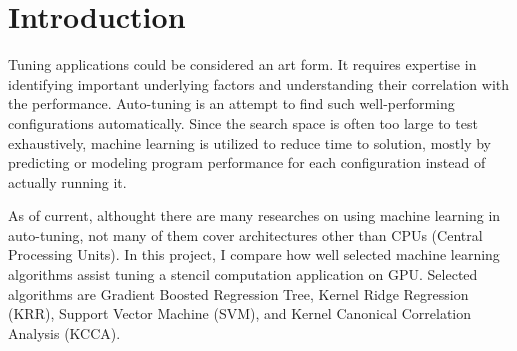 \section{Introduction} %

Tuning applications could be considered an art form. It requires expertise in identifying important underlying factors and understanding their correlation with the performance. Auto-tuning is an attempt to find such well-performing configurations automatically. Since the search space is often too large to test exhaustively, machine learning is utilized to reduce time to solution, mostly by predicting or modeling program performance for each configuration instead of actually running it.

As of current, althought there are many researches on using machine learning in auto-tuning, not many of them cover architectures other than CPUs (Central Processing Units). In this project, I compare how well selected machine learning algorithms assist tuning a stencil computation application on GPU. Selected algorithms are Gradient Boosted Regression Tree, Kernel Ridge Regression (KRR), Support Vector Machine (SVM), and Kernel Canonical Correlation Analysis (KCCA).

